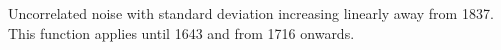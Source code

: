 Uncorrelated noise with standard deviation increasing linearly away from 1837. This function applies until 1643 and from 1716 onwards.